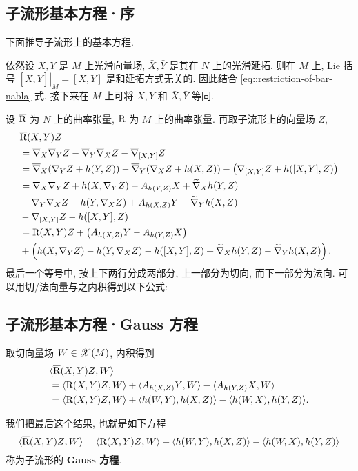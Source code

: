 \subsection{子流形基本方程·序}
下面推导子流形上的基本方程.

依然设 $X, Y$ 是 $M$ 上光滑向量场, $\bar{X}, \bar{Y}$ 是其在 $N$ 上的光滑延拓. 则在 $M$ 上, Lie 括号 $\left.[\bar{X}, \bar{Y}]\right|_{M} = [X, Y]$ 是和延拓方式无关的. 因此结合 \ref{eq::restriction-of-bar-nabla} 式, 接下来在 $M$ 上可将 $X, Y$ 和 $\bar{X}, \bar{Y}$ 等同.

设 $\overline{\mathrm{R}}$ 为 $N$ 上的曲率张量, $\mathrm{R}$ 为 $M$ 上的曲率张量. 再取子流形上的向量场 $Z$,
\begin{align*}
	&\overline{\mathrm{R}}(X, Y)Z \\
	&= \overline{\nabla}_{X}{\overline{\nabla}_{Y}{Z}} - \overline{\nabla}_{Y}{\overline{\nabla}_{X}{Z}} - \overline{\nabla}_{[X, Y]}{Z} \\
	&= \overline{\nabla}_{X}{\left(\nabla_{Y}{Z} + h(Y, Z)\right)} - \overline{\nabla}_{Y}{\left(\nabla_{X}{Z} + h(X, Z)\right)} - \left(\nabla_{[X, Y]}{Z} + h([X, Y], Z)\right) \\
	&= \nabla_{X}{\nabla_{Y}{Z}} + h(X, \nabla_{Y}{Z}) - A_{h(Y, Z)}{X} + \widetilde{\nabla}_{X}{h(Y, Z)} \\
	&- \nabla_{Y}{\nabla_{X}{Z}} - h(Y, \nabla_{X}{Z}) + A_{h(X, Z)}{Y} - \widetilde{\nabla}_{Y}{h(X, Z)} \\
	&- \nabla_{[X, Y]}{Z} - h([X, Y], Z) \\
	&= \mathrm{R}(X, Y)Z + \left(A_{h(X, Z)}{Y} - A_{h(Y, Z)}{X}\right) \\
	&+ \left(h(X, \nabla_{Y}{Z}) - h(Y, \nabla_{X}{Z}) - h([X, Y], Z) + \widetilde{\nabla}_{X}{h(Y, Z)} - \widetilde{\nabla}_{Y}{h(X, Z)}\right).
\end{align*}
最后一个等号中, 按上下两行分成两部分, 上一部分为切向, 而下一部分为法向. 可以用切/法向量与之内积得到以下公式:

\subsection{子流形基本方程·Gauss 方程}
取切向量场 $W \in \mathscr{X}(M)$, 内积得到
\begin{align*}
	&\langle {\overline{\mathrm{R}}(X, Y)Z}, {W} \rangle \\
	&= \langle {\mathrm{R}(X, Y)Z}, {W} \rangle + \langle {A_{h(X, Z)}{Y}}, {W} \rangle - \langle {A_{h(Y, Z)}{X}}, {W} \rangle \\
	&= \langle {\mathrm{R}(X, Y)Z}, {W} \rangle + \langle {h(W, Y)}, {h(X, Z)} \rangle - \langle {h(W, X)}, {h(Y, Z)} \rangle.
\end{align*}

我们把最后这个结果, 也就是如下方程
\begin{equation}\label{eq::Gauss-equation}
	\langle {\overline{\mathrm{R}}(X, Y)Z}, {W} \rangle = \langle {\mathrm{R}(X, Y)Z}, {W} \rangle + \langle {h(W, Y)}, {h(X, Z)} \rangle - \langle {h(W, X)}, {h(Y, Z)} \rangle
\end{equation}
称为子流形的 {\bf Gauss 方程}.

